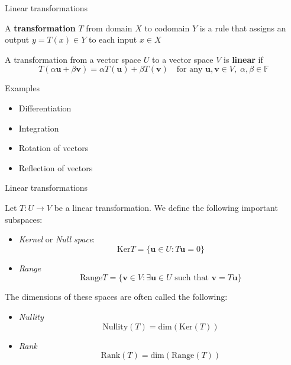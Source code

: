 \documentclass [aspectratio=169]{beamer}
\newcommand{\bu}{{\mathbf{u}}}
\newcommand{\bv}{{\mathbf{v}}}
\newcommand{\F}{{\mathds{F}}}
\begin{document}
\begin{frame}{Linear transformations}
\begin{definition}
A \textbf{transformation} $T$ from domain $X$ to codomain $Y$ is a rule that assigns an output $y = T(x) \in Y$ to each input $x \in X$
\end{definition}

\begin{definition}
A transformation from a vector space $U$ to a vector space $V$ is \textbf{linear} if
\begin{equation*}
    T(\alpha \bu + \beta \bv) = \alpha T(\bu) + \beta T(\bv) \quad \text{for any } \bu, \bv \in V, \; \alpha, \beta \in \F
\end{equation*}
\end{definition}

\end{frame}


\begin{frame}{Examples}

\begin{itemize}
\item Differentiation
\item Integration
\item Rotation of vectors
\item Reflection of vectors
\end{itemize}


\end{frame}


\begin{frame}{Linear transformations}
\begin{definition}
Let $T:U \to V$ be a linear transformation. We define the following important subspaces:
\begin{itemize}
\item \emph{Kernel} or \emph{Null space}: 
$$\text{Ker} T = \{\bu \in U : T\bu = 0 \}$$
\item \emph{Range} 
$$\text{Range} T = \{\bv \in V : \exists \bu \in U \text{ such that } \bv = T \bu \}$$
\end{itemize}
The dimensions of these spaces are often called the following:
\begin{itemize}
\item \emph{Nullity}
$$\text{Nullity}(T) = \text{dim}(\text{Ker}(T))$$
\item \emph{Rank}
$$\text{Rank}(T) = \text{dim}(\text{Range}(T))$$
\end{itemize}
\end{definition}

\end{frame}
\end{document}

